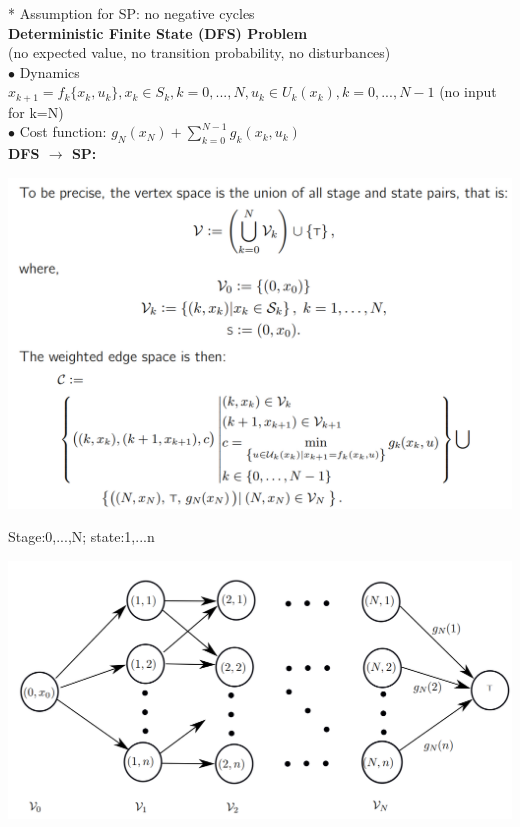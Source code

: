 \documentclass[10pt,landscape]{article}
\newenvironment{Figure}
{\par\medskip\noindent\minipage{\linewidth}}
{\endminipage\par\medskip}
\begin{document}
\begin{multicols*}{4}
* Assumption for SP: no negative cycles\\

\textbf{Deterministic Finite State (DFS) Problem}\\
(no expected value, no transition probability, no disturbances)\\

$\bullet$ Dynamics\\ 
$x_{k+1} = f_k\{x_k,u_k\}, x_k\in S_k, k=0,...,N, u_k \in U_k(x_k), k=0,...,N-1$ (no input for k=N)\\
$\bullet$ Cost function: $g_N(x_N) + \sum_{k=0}^{N-1} g_k(x_k, u_k)$\\

\textbf{DFS $\rightarrow$ SP:}\\
\begin{Figure}
	\centering
	\includegraphics[width=\linewidth]{pictures/DFS_SP_description.png}
\end{Figure}

Stage:0,...,N; state:1,...n

\begin{Figure}
	\centering
	\includegraphics[width=\linewidth]{pictures/DFS_SP.png}
\end{Figure}


\end{multicols*}
\end{document}
